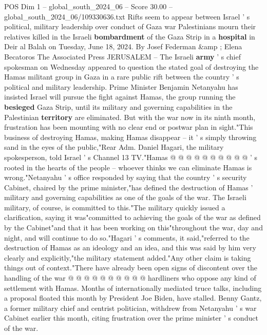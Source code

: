 \begin{textsample}{POS Dim 1 – global\_south\_2024\_06 – Score 30.00 – global\_south\_2024\_06/109330636.txt}  \label{ex:f1_pos_049}
Rifts seem to appear between Israel ' s political, military leadership over conduct of Gaza war Palestinians mourn their relatives killed in the Israeli \textbf{bombardment} of the Gaza Strip in a \textbf{hospital} in Deir al Balah on Tuesday, June 18, 2024.
By Josef Federman \&amp ; Elena Becatoros The Associated Press JERUSALEM -- The Israeli \textbf{army} ' s chief spokesman on Wednesday appeared to question the stated goal of destroying the Hamas militant group in Gaza in a rare public rift between the country ' s political and military leadership.
Prime Minister Benjamin Netanyahu has insisted Israel will pursue the fight against Hamas, the group running the \textbf{besieged} Gaza Strip, until its military and governing capabilities in the Palestinian \textbf{territory} are eliminated.
But with the war now in its ninth month, frustration has been mounting with no clear end or postwar plan in sight."This business of destroying Hamas, making Hamas disappear -- it ' s simply throwing sand in the eyes of the public,"Rear Adm.
Daniel Hagari, the military spokesperson, told Israel ' s Channel 13 TV."Hamas @ @ @ @ @ @ @ @ @ @ ' s rooted in the hearts of the people -- whoever thinks we can eliminate Hamas is wrong."Netanyahu ' s office responded by saying that the country ' s security Cabinet, chaired by the prime minister,"has defined the destruction of Hamas ' military and governing capabilities as one of the goals of the war.
The Israeli military, of course, is committed to this."The military quickly issued a clarification, saying it was"committed to achieving the goals of the war as defined by the Cabinet"and that it has been working on this"throughout the war, day and night, and will continue to do so."Hagari ' s comments, it said,"referred to the destruction of Hamas as an ideology and an idea, and this was said by him very clearly and explicitly,"the military statement added."Any other claim is taking things out of context."There have already been open signs of discontent over the handling of the war @ @ @ @ @ @ @ @ @ @ hardliners who oppose any kind of settlement with Hamas.
Months of internationally mediated truce talks, including a proposal floated this month by President Joe Biden, have stalled.
Benny Gantz, a former military chief and centrist politician, withdrew from Netanyahu ' s war Cabinet earlier this month, citing frustration over the prime minister ' s conduct of the war.

\end{textsample}
